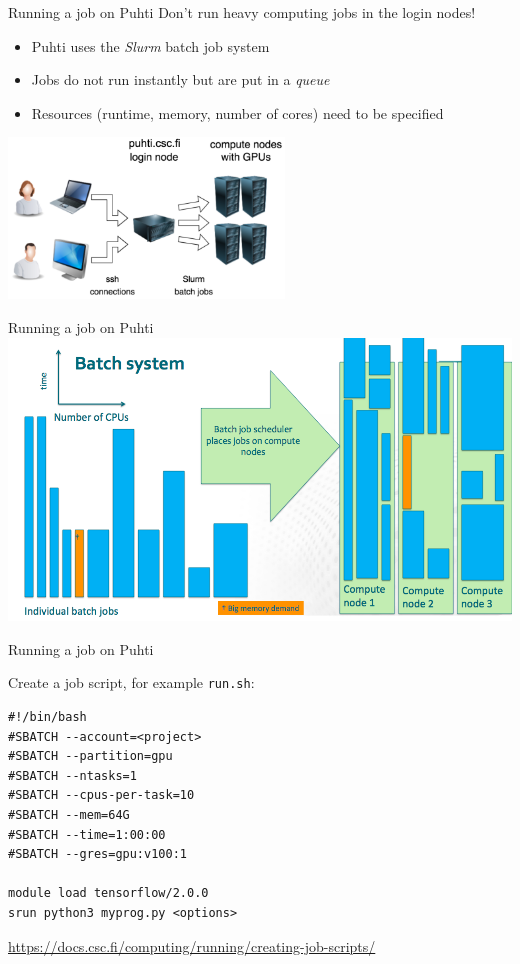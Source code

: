 \documentclass[aspectratio=1610,14pt]{beamer}
\newcommand{\link}[1]{\alert{\url{#1}}}
\begin{document}
\begin{frame}{Running a job on Puhti}
  \alert{Don't run heavy computing jobs in the login nodes!}
  \vspace{2mm}
  \begin{itemize}
  \item Puhti uses the \emph{Slurm} batch job system
  \item Jobs do not run instantly but are put in a \emph{queue}
  \item Resources (runtime, memory, number of cores) need to be specified
  \end{itemize}

  \vspace{-4mm}
  \begin{center}
    \includegraphics[width=0.55\textwidth]{slurm1.png}    
  \end{center}
\end{frame}

\begin{frame}{Running a job on Puhti}
  \includegraphics[width=\textwidth]{slurm2.png}
\end{frame}

\begin{frame}[fragile]{Running a job on Puhti}

  Create a job script, for example {\tt run.sh}:
  
\begin{verbatim}
#!/bin/bash
#SBATCH --account=<project>
#SBATCH --partition=gpu
#SBATCH --ntasks=1
#SBATCH --cpus-per-task=10
#SBATCH --mem=64G
#SBATCH --time=1:00:00
#SBATCH --gres=gpu:v100:1

module load tensorflow/2.0.0
srun python3 myprog.py <options>
\end{verbatim}

{\small \link{https://docs.csc.fi/computing/running/creating-job-scripts/}}
\end{frame}
\end{document}

